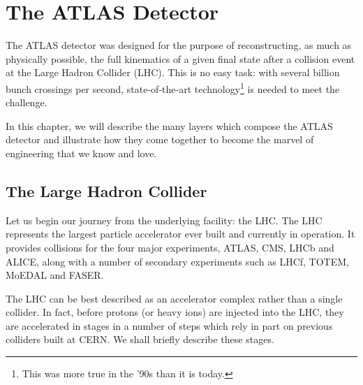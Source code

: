 \documentclass[10pt,a4paper]{book}
\author{Alberto Rescia}
\begin{document}
\chapter{The ATLAS Detector}



The ATLAS detector was designed for the purpose of reconstructing, as much as physically possible, the full kinematics of a given final state after a collision event at the Large Hadron Collider (LHC). This is no easy task: with several billion bunch crossings per second, state-of-the-art technology\footnote{This was more true in the '90s than it is today.} is needed to meet the challenge. 

In this chapter, we will describe the many layers which compose the ATLAS detector and illustrate how they come together to become the marvel of engineering that we know and love.

\section{The Large Hadron Collider}

Let us begin our journey from the underlying facility: the LHC. The LHC represents the largest particle accelerator ever built and currently in operation. It provides collisions for the four major experiments, ATLAS, CMS, LHCb and ALICE, along with a number of secondary experiments such as LHCf, TOTEM, MoEDAL and FASER. 

The LHC can be best described as an accelerator complex rather than a single collider. In fact, before protons (or heavy ions) are injected into the LHC, they are accelerated in stages in a number of steps which rely in part on previous colliders built at CERN. We shall briefly describe these stages.
\end{document}
